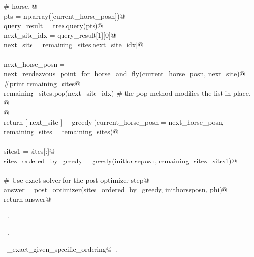 \documentclass[11.5pt]{report}
\begin{document}
\begin{flushleft}
\begin{list}{}{}
\mbox{}\verb@                  # horse. @\\
\mbox{}\verb@                  pts           = np.array([current_horse_posn])@\\
\mbox{}\verb@                  query_result  = tree.query(pts)@\\
\mbox{}\verb@                  next_site_idx = query_result[1][0]@\\
\mbox{}\verb@                  next_site     = remaining_sites[next_site_idx]@\\
\mbox{}\verb@@\\
\mbox{}\verb@                  next_horse_posn = \@\\
\mbox{}\verb@                        next_rendezvous_point_for_horse_and_fly(current_horse_posn, next_site)@\\
\mbox{}\verb@                  #print remaining_sites@\\
\mbox{}\verb@                  remaining_sites.pop(next_site_idx) # the pop method modifies the list in place. @\\
\mbox{}\verb@                  @\\
\mbox{}\verb@                  return [ next_site ] + greedy (current_horse_posn = next_horse_posn, \@\\
\mbox{}\verb@                                                 remaining_sites    = remaining_sites)@\\
\mbox{}\verb@@\\
\mbox{}\verb@      sites1 = sites[:]@\\
\mbox{}\verb@      sites_ordered_by_greedy = greedy(inithorseposn, remaining_sites=sites1)@\\
\mbox{}\verb@@\\
\mbox{}\verb@      # Use exact solver for the post optimizer step@\\
\mbox{}\verb@      answer = post_optimizer(sites_ordered_by_greedy, inithorseposn, phi)@\\
\mbox{}\verb@      return answer@\\
\mbox{}\verb@@{\NWsep}
\end{list}
\vspace{-1.5ex}
\footnotesize
\begin{list}{}{\setlength{\itemsep}{-\parsep}\setlength{\itemindent}{-\leftmargin}}
\item \NWtxtMacroDefBy\ .
\item \NWtxtMacroRefIn\ .
\item \NWtxtIdentsUsed\nobreak\  \verb@algo_exact_given_specific_ordering@\nobreak\ .
\item{}
\end{list}
\vspace{4ex}
\end{flushleft}
\end{document}
